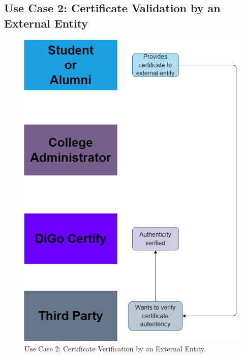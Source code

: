 \subsection{Use Case 2: Certificate Validation by an External Entity}

\begin{figure}[H]
    \centering
    \includegraphics[height=0.6\textwidth, keepaspectratio]{./assets/certificate-validation.drawio.png}
    \caption{Use Case 2: Certificate Verification by an External Entity.}
    \label{fig:use-case-2}
\end{figure}

